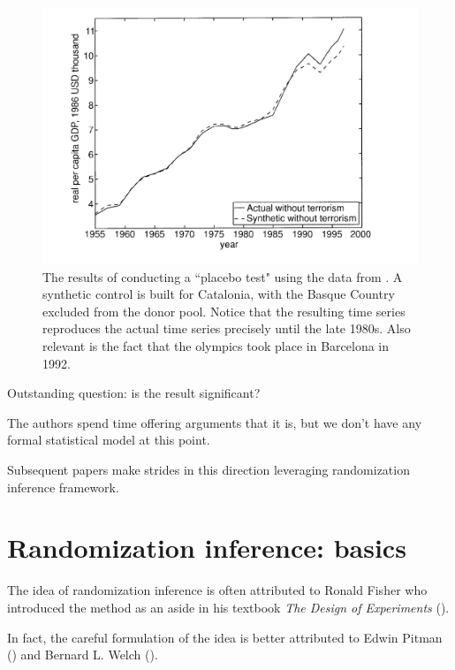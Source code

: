 \documentclass[notes,11pt, aspectratio=169]{beamer}
\newenvironment{wideitemize}{\itemize\addtolength{\itemsep}{10pt}}{\enditemize}
\begin{document}
\begin{frame}{}
    \begin{figure}
        \centering
        \includegraphics[width = .7 \linewidth]{figures/ag2003_cat.png}
        \caption*{ \tiny The results of conducting a ``placebo test" using the data from 
        \cite{abadie_economic_2003}. A synthetic control is built for Catalonia, with
        the Basque Country excluded from the donor pool. Notice that the resulting time
        series reproduces the actual time series precisely until the late 1980s. Also relevant is the fact that the olympics took place in Barcelona in 1992.}
        \label{fig:enter-label}
    \end{figure}
\end{frame}

\begin{frame}{}

    \begin{wideitemize}
        \item Outstanding question: is the result significant?
        \item The authors spend time offering arguments that it is, but we don't have
            any formal statistical model at this point.
        \item Subsequent papers make strides in this direction leveraging
            randomization inference framework.
    \end{wideitemize}
 
\end{frame}

\section{Randomization inference: basics}

\begin{frame}{}

    \begin{wideitemize}
        \item The idea of randomization inference is often attributed 
        to Ronald Fisher who introduced the method as an aside in his 
        textbook \textit{The Design of Experiments}
        (\cite{fisher_design_1974}).
        \item In fact, the careful formulation of the idea is better
        attributed to
        Edwin Pitman (\citeyear{pitman_significance_1937}) and
        Bernard L. Welch (\citeyear{welch_z-test_1937}).
    \end{wideitemize}
    
\end{frame}
\end{document}
